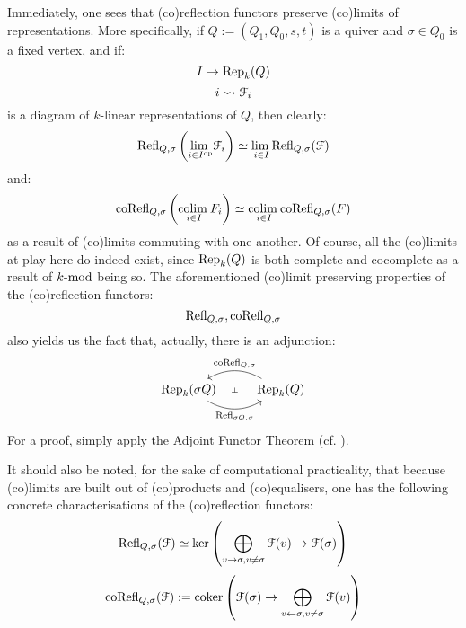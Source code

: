             \begin{remark} \label{remark: categorical_properties_of_(co)reflection_functors}
                Immediately, one sees that (co)reflection functors preserve (co)limits of representations. More specifically, if $Q := (Q_1, Q_0, s, t)$ is a quiver and $\sigma \in Q_0$ is a fixed vertex, and if:
                    $$I \to \Rep_k(Q)$$
                    $$i \mapsto \calF_i$$
                is a diagram of $k$-linear representations of $Q$, then clearly:
                    $$\Refl_{Q, \sigma}\left( \underset{i \in I^{\op}}{\lim} \calF_i \right) \cong \underset{i \in I}{\lim} \Refl_{Q, \sigma}(\calF)$$
                and:
                    $$\co\Refl_{Q, \sigma}\left( \underset{i \in I}{\colim} F_i \right) \cong \underset{i \in I}{\colim} \co\Refl_{Q, \sigma}(F)$$
                as a result of (co)limits commuting with one another. Of course, all the (co)limits at play here do indeed exist, since $\Rep_k(Q)$ is both complete and cocomplete as a result of $k\mod$ being so. The aforementioned (co)limit preserving properties of the (co)reflection functors:
                    $$\Refl_{Q, \sigma}, \co\Refl_{Q, \sigma}$$
                also yields us the fact that, actually, there is an adjunction:
                    $$
                        \begin{tikzcd}
                        	{\Rep_k(\sigma Q)} & {\Rep_k(Q)}
                        	\arrow[""{name=0, anchor=center, inner sep=0}, "{\Refl_{\sigma Q, \sigma}}"', bend right, from=1-1, to=1-2]
                        	\arrow[""{name=1, anchor=center, inner sep=0}, "{\co\Refl_{Q, \sigma}}"', bend right, from=1-2, to=1-1]
                        	\arrow["\dashv"{anchor=center, rotate=-90}, draw=none, from=1, to=0]
                        \end{tikzcd}
                    $$
                For a proof, simply apply the Adjoint Functor Theorem (cf. \cite{nlab:adjoint_functor_theorem}).
                
                It should also be noted, for the sake of computational practicality, that because (co)limits are built out of (co)products and (co)equalisers, one has the following concrete characterisations of the (co)reflection functors:
                    $$\Refl_{Q, \sigma}(\calF) \cong \ker\left(\bigoplus_{v \to \sigma, v \not = \sigma} \calF(v) \to \calF(\sigma)\right)$$
                    $$\co\Refl_{Q, \sigma}(\calF) := \coker\left(\calF(\sigma) \to \bigoplus_{v \leftarrow \sigma, v \not = \sigma} \calF(v)\right)$$
            \end{remark}
